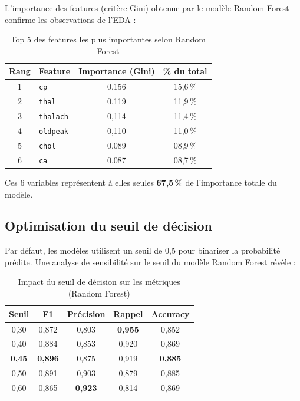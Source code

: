 \documentclass[12pt,a4paper]{article}
\newcommand{\feat}[1]{\texttt{\textcolor{medblue}{#1}}}
\newcommand{\best}[1]{\textbf{\textcolor{medgreen}{#1}}}
\begin{document}
            L'importance des features (critère Gini) obtenue par le modèle Random Forest confirme les observations de l'EDA :
            
            \begin{table}[H]
              \centering
              \caption{Top 5 des features les plus importantes selon Random Forest}
              \label{tab:importance}
              \begin{tabular}{clcc}
                \toprule
                \textbf{Rang} & \textbf{Feature} & \textbf{Importance (Gini)} & \textbf{\% du total} \\
                \midrule
                1 & \feat{cp}      & 0{,}156 & 15{,}6\,\% \\
                2 & \feat{thal}    & 0{,}119 & 11{,}9\,\% \\
                3 & \feat{thalach} & 0{,}114 & 11{,}4\,\% \\
                4 & \feat{oldpeak} & 0{,}110 & 11{,}0\,\%  \\
                5 & \feat{chol}      & 0{,}089 & 08{,}9\,\% \\
                6 & \feat{ca}      & 0{,}087 & 08{,}7\,\% \\
                \bottomrule
              \end{tabular}
            \end{table}
            
            Ces 6 variables représentent à elles seules \textbf{67{,}5\,\%} de l'importance totale du modèle.
            
        \subsection{Optimisation du seuil de décision}

            Par défaut, les modèles utilisent un seuil de 0{,}5 pour binariser la probabilité prédite. Une analyse de sensibilité sur le seuil du modèle Random Forest révèle :
            
            \begin{table}[H]
              \centering
              \caption{Impact du seuil de décision sur les métriques (Random Forest)}
              \label{tab:thresh}
              \begin{tabular}{ccccc}
                \toprule
                \textbf{Seuil} & \textbf{F1} & \textbf{Précision} & \textbf{Rappel} & \textbf{Accuracy} \\
                \midrule
                0{,}30 & 0{,}872 & 0{,}803 & \best{0{,}955} & 0{,}852 \\
                0{,}40 & 0{,}884 & 0{,}853 & 0{,}920 & 0{,}869 \\
                \best{0{,}45} & \best{0{,}896} & 0{,}875 & 0{,}919 & \best{0{,}885} \\
                0{,}50 & 0{,}891 & 0{,}903 & 0{,}879 & 0{,}885 \\
                0{,}60 & 0{,}865 & \best{0{,}923} & 0{,}814 & 0{,}869 \\
                \bottomrule
              \end{tabular}
            \end{table}
            
\end{document}
